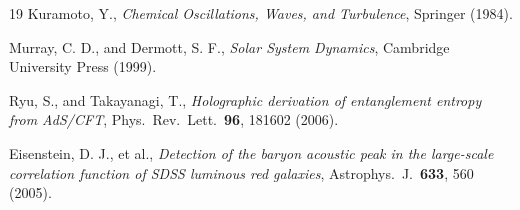 \documentclass[11pt]{article}
\theoremstyle{remark}
\begin{document}
\begin{thebibliography}{19}
 Kuramoto, Y., \emph{Chemical Oscillations, Waves, and Turbulence}, Springer (1984).

 Murray, C. D., and Dermott, S. F., \emph{Solar System Dynamics}, Cambridge University Press (1999).

 Ryu, S., and Takayanagi, T., \emph{Holographic derivation of entanglement entropy from AdS/CFT}, Phys.\ Rev.\ Lett.\ \textbf{96}, 181602 (2006).

 Eisenstein, D. J., et al., \emph{Detection of the baryon acoustic peak in the large-scale correlation function of SDSS luminous red galaxies}, Astrophys.\ J.\ \textbf{633}, 560 (2005).

\end{thebibliography}
\end{document}
